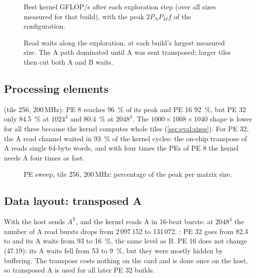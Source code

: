 \begin{figure}[ht]
  \centering
  
  \caption{Best kernel GFLOP/s after each exploration step (over all sizes measured for that build), with the peak
    \(2P_NP_Mf\) of the configuration.}
  \label{fig:progress}
\end{figure}

\begin{figure}[ht]
  \centering
  
  \caption{Read waits along the exploration, at each build's largest measured size. The A path dominated until A was
    sent transposed; larger tiles then cut both A and B waits.}
  \label{fig:stalls}
\end{figure}

\subsection{Processing elements}
 (tile 256, 200\,MHz): PE 8 reaches \SI{96}{\percent} of its peak and PE 16
\SI{92}{\percent}, but PE 32 only \SI{84.5}{\percent} at \(1024^3\) and \SI{80.4}{\percent} at \(2048^3\). The
\(1000\times1008\times1040\) shape is lower for all three because the kernel computes whole tiles
(\cref{sec:eval:sizes}). For PE 32, the A read channel waited in \SI{93}{\percent} of the kernel cycles: the
on-chip transpose of A reads single 64-byte words, and with four times the PEs of PE 8 the kernel needs A four times
as fast.

\begin{figure}[ht]
  \centering
  
  \caption{PE sweep, tile 256, 200\,MHz: percentage of the peak per matrix size.}
  \label{fig:pe_sweep}
\end{figure}

\subsection{Data layout: transposed A}
\label{sec:eval:layout}
With  the host sends \(A^\mathsf{T}\), and the kernel reads A in 16-beat bursts: at \(2048^3\)
the number of A read bursts drops from 2\,097\,152 to 131\,072. : PE 32 goes from 82.3 to
 and its A waits from 93 to \SI{16}{\percent}, the same level as B. PE 16 does not change (47.19): its
A waits fell from 53 to \SI{9}{\percent}, but they were mostly hidden by buffering. The transpose costs nothing on the
card and is done once on the host, so transposed A is used for all later PE 32 builds.

